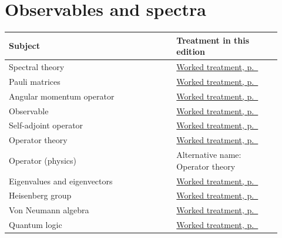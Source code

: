 \documentclass[11pt,oneside]{book}
\begin{document}
\section*{Observables and spectra}
\begin{longtable}{p{0.57\linewidth}p{0.35\linewidth}}
\toprule Subject & Treatment in this edition \\
\midrule\endhead
{}\label{index:spectral-theory}Spectral theory & \hyperref[topic:spectral-theory]{Worked treatment, p.~\pageref*{topic:spectral-theory}} \\
\label{index:pauli-matrices}Pauli matrices & \hyperref[topic:pauli-matrices]{Worked treatment, p.~\pageref*{topic:pauli-matrices}} \\
\label{index:angular-momentum-operator}Angular momentum operator & \hyperref[topic:angular-momentum-operator]{Worked treatment, p.~\pageref*{topic:angular-momentum-operator}} \\
\label{index:observable}Observable & \hyperref[topic:observable]{Worked treatment, p.~\pageref*{topic:observable}} \\
\label{index:self-adjoint-operator}Self-adjoint operator & \hyperref[topic:self-adjoint-operator]{Worked treatment, p.~\pageref*{topic:self-adjoint-operator}} \\
\label{index:operator-theory}Operator theory & \hyperref[topic:operator-theory]{Worked treatment, p.~\pageref*{topic:operator-theory}} \\
\label{index:operator-physics}Operator (physics) & Alternative name: Operator theory \\
\label{index:eigenvalues-and-eigenvectors}Eigenvalues and eigenvectors & \hyperref[topic:eigenvalues-and-eigenvectors]{Worked treatment, p.~\pageref*{topic:eigenvalues-and-eigenvectors}} \\
\label{index:heisenberg-group}Heisenberg group & \hyperref[topic:heisenberg-group]{Worked treatment, p.~\pageref*{topic:heisenberg-group}} \\
\label{index:von-neumann-algebra}Von Neumann algebra & \hyperref[topic:von-neumann-algebra]{Worked treatment, p.~\pageref*{topic:von-neumann-algebra}} \\
\label{index:quantum-logic}Quantum logic & \hyperref[topic:quantum-logic]{Worked treatment, p.~\pageref*{topic:quantum-logic}} \\
\bottomrule
\end{longtable}
\end{document}
